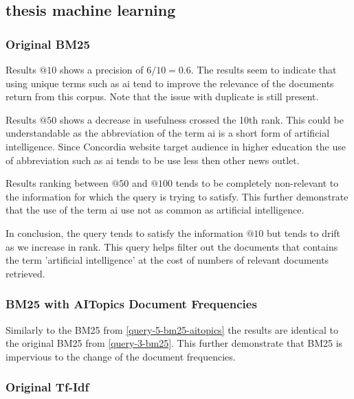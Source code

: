 \subsection{thesis machine learning}\label{query-6}

\subsubsection{Original BM25}\label{query-6-bm25}

\par Results $@10$ shows a precision of $6/10=0.6$. The results seem to indicate that using unique terms such as ai tend to improve the relevance of the documents return from this corpus. Note that the issue with duplicate is still present.
\par Results $@50$ shows a decrease in usefulness crossed the 10th rank. This could be understandable as the abbreviation of the term ai is a short form of artificial intelligence. Since Concordia website target audience in higher education the use of abbreviation such as ai tends to be use less then other news outlet.
\par Results ranking between $@50$ and $@100$ tends to be completely non-relevant to the information for which the query is trying to satisfy. This further demonstrate that the use of the term ai use not as common as artificial intelligence. 
\par In conclusion, the query tends to satisfy the information $@10$ but tends to drift as we increase in rank. This query helps filter out the documents that contains the term 'artificial intelligence' at the cost of numbers of relevant documents retrieved.

\subsubsection{BM25 with AITopics Document Frequencies}\label{query-6-bm25-aitopics}

\par Similarly to the BM25 from \ref{query-5-bm25-aitopics} the results are identical to the original BM25 from \ref{query-3-bm25}. This further demonstrate that BM25 is impervious to the change of the document frequencies.

\subsubsection{Original Tf-Idf}\label{query-6-tf-idf}

